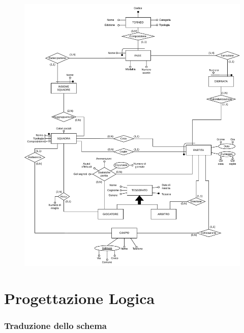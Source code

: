 \documentclass[11pt, openany]{article}
\theoremstyle{definition}
\theoremstyle{plain}
\theoremstyle{remark}
\begin{document}
			\begin{figure}[t!]
				\includegraphics[scale=0.95, center]{./include/bdsi-prog-2023-ER.pdf}
				\label{fig:ER}
			\end{figure}
	\newpage		
	\part{Progettazione Logica}
		\section{Traduzione dello schema}
\end{document}
